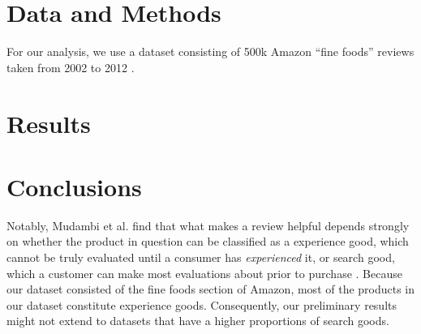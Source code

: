\documentclass[10pt]{article}
\begin{document}
\section*{Data and Methods}
For our analysis, we use a dataset consisting of 500k Amazon ``fine foods'' reviews taken from 2002 to 2012 \cite{mcauley2013amateurs}.

\section*{Results}

\section*{Conclusions}

Notably, Mudambi et al. find that what makes a review helpful depends strongly on whether the product in question can be classified as a experience good, which cannot be truly evaluated until a consumer has \emph{experienced} it, or search good, which a customer can make most evaluations about prior to purchase \cite{mudambi2010makes}. Because our dataset consisted of the fine foods section of Amazon, most of the products in our dataset constitute experience goods. Consequently, our preliminary results might not extend to datasets that have a higher proportions of search goods.


\end{document}
